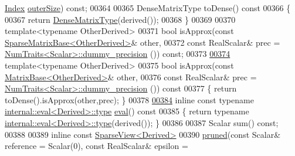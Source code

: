\begin{DoxyCode}
      \hyperlink{group___core___module_a554f30542cc2316add4b1ea0a492ff02}{Index} \hyperlink{group___sparse_core___module_ac86cc88a4cfef21db6b64ec0ab4c8f0a}{outerSize}) \textcolor{keyword}{const};
00364 
00365     DenseMatrixType toDense()\textcolor{keyword}{ const}
00366 \textcolor{keyword}{    }\{
00367       \textcolor{keywordflow}{return} \hyperlink{group___sparse_core___module_acca1ed7c478dbd2b36b7ef14cb781cff}{DenseMatrixType}(derived());
00368     \}
00369 
00370     \textcolor{keyword}{template}<\textcolor{keyword}{typename} OtherDerived>
00371     \textcolor{keywordtype}{bool} isApprox(\textcolor{keyword}{const} \hyperlink{group___sparse_core___module_class_eigen_1_1_sparse_matrix_base}{SparseMatrixBase<OtherDerived>}& other,
00372                   \textcolor{keyword}{const} RealScalar& prec = \hyperlink{group___core___module_struct_eigen_1_1_num_traits}{NumTraits<Scalar>::dummy\_precision}
      ()) \textcolor{keyword}{const};
00373 
\hyperlink{group___sparse_core___module_af0e6f2ff2f449cae8f7b19bd34dec4ce}{00374}     \textcolor{keyword}{template}<\textcolor{keyword}{typename} OtherDerived>
00375     \textcolor{keywordtype}{bool} isApprox(\textcolor{keyword}{const} \hyperlink{group___core___module_class_eigen_1_1_matrix_base}{MatrixBase<OtherDerived>}& other,
00376                   \textcolor{keyword}{const} RealScalar& prec = \hyperlink{group___core___module_struct_eigen_1_1_num_traits}{NumTraits<Scalar>::dummy\_precision}
      ())\textcolor{keyword}{ const}
00377 \textcolor{keyword}{    }\{ \textcolor{keywordflow}{return} toDense().isApprox(other,prec); \}
00378 
\hyperlink{group___sparse_core___module_a761bd872a06b59632fcff7b7807a77ce}{00384}     \textcolor{keyword}{inline} \textcolor{keyword}{const} \textcolor{keyword}{typename} \hyperlink{struct_eigen_1_1internal_1_1eval}{internal::eval<Derived>::type} 
      \hyperlink{group___sparse_core___module_a761bd872a06b59632fcff7b7807a77ce}{eval}()\textcolor{keyword}{ const}
00385 \textcolor{keyword}{    }\{ \textcolor{keywordflow}{return} \textcolor{keyword}{typename} \hyperlink{struct_eigen_1_1internal_1_1eval}{internal::eval<Derived>::type}(derived()); \}
00386 
00387     Scalar sum() \textcolor{keyword}{const};
00388     
00389     \textcolor{keyword}{inline} \textcolor{keyword}{const} \hyperlink{group___sparse_core___module_class_eigen_1_1_sparse_view}{SparseView<Derived>}
00390     \hyperlink{group___sparse_core___module_ac8d0414b56d9d620ce9a698c1b281e5d}{pruned}(\textcolor{keyword}{const} Scalar& reference = Scalar(0), \textcolor{keyword}{const} RealScalar& epsilon = 

\end{DoxyCode}
